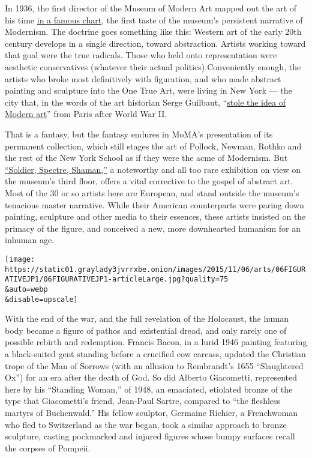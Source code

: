 In 1936, the first director of the Museum of Modern Art mapped out the
art of his time
\href{http://www.moma.org/learn/resources/archives/archives_highlights_02_1936}{in
a famous chart}, the first taste of the museum's persistent narrative of
Modernism. The doctrine goes something like this: Western art of the
early 20th century develops in a single direction, toward abstraction.
Artists working toward that goal were the true radicals. Those who held
onto representation were aesthetic conservatives (whatever their actual
politics).Conveniently enough, the artists who broke most definitively
with figuration, and who made abstract painting and sculpture into the
One True Art, were living in New York --- the city that, in the words of
the art historian Serge Guilbaut,
``\href{http://www.nytimes3xbfgragh.onion/1984/01/01/books/behind-the-scenes-of-abstract-expressionism.html?pagewanted=all}{stole
the idea of Modern art}'' from Paris after World War II.

That is a fantasy, but the fantasy endures in MoMA's presentation of its
permanent collection, which still stages the art of Pollock, Newman,
Rothko and the rest of the New York School as if they were the acme of
Modernism. But
\href{https://www.moma.org/calendar/exhibitions/1551?locale=en}{``Soldier,
Spectre, Shaman,''} a noteworthy and all too rare exhibition on view on
the museum's third floor, offers a vital corrective to the gospel of
abstract art. Most of the 30 or so artists here are European, and stand
outside the museum's tenacious master narrative. While their American
counterparts were paring down painting, sculpture and other media to
their essences, these artists insisted on the primacy of the figure, and
conceived a new, more downhearted humanism for an inhuman age.

\texttt{[image: https://static01.graylady3jvrrxbe.onion/images/2015/11/06/arts/06FIGURATIVEJP1/06FIGURATIVEJP1-articleLarge.jpg?quality=75\\\&auto=webp\\\&disable=upscale]}

With the end of the war, and the full revelation of the Holocaust, the
human body became a figure of pathos and existential dread, and only
rarely one of possible rebirth and redemption. Francis Bacon, in a lurid
1946 painting featuring a black-suited gent standing before a crucified
cow carcass, updated the Christian trope of the Man of Sorrows (with an
allusion to Rembrandt's 1655 ``Slaughtered Ox'') for an era after the
death of God. So did Alberto Giacometti, represented here by his
``Standing Woman,'' of 1948, an emaciated, etiolated bronze of the type
that Giacometti's friend, Jean-Paul Sartre, compared to ``the fleshless
martyrs of Buchenwald.'' His fellow sculptor, Germaine Richier, a
Frenchwoman who fled to Switzerland as the war began, took a similar
approach to bronze sculpture, casting pockmarked and injured figures
whose bumpy surfaces recall the corpses of Pompeii.

